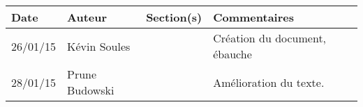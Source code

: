 \small
\begin{tabular}{|p{1.5cm}|l|p{2.5cm}|p{7.8cm}|l|}
  \hline
 
   \rowcolor{Gainsboro}Date  & Auteur & Section(s) & Commentaires \\
  \hline
26/01/15 & Kévin Soules &  & Création du document, ébauche\\
  \hline
28/01/15 & Prune Budowski & & Amélioration du texte.
\\
  \hline
\end{tabular}
\normalsize
